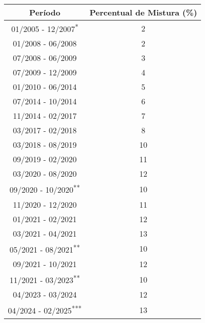 \begin{tabular}{|c|c|}
	\hline
	\textbf{Período}                       & \textbf{Percentual de Mistura (\%)} \\
	\hline
	01/2005 - 12/2007\textsuperscript{*}   & 2                                   \\
	01/2008 - 06/2008                      & 2                                   \\
	07/2008 - 06/2009                      & 3                                   \\
	07/2009 - 12/2009                      & 4                                   \\
	01/2010 - 06/2014                      & 5                                   \\
	07/2014 - 10/2014                      & 6                                   \\
	11/2014 - 02/2017                      & 7                                   \\
	03/2017 - 02/2018                      & 8                                   \\
	03/2018 - 08/2019                      & 10                                  \\
	09/2019 - 02/2020                      & 11                                  \\
	03/2020 - 08/2020                      & 12                                  \\
	09/2020 - 10/2020\textsuperscript{**}  & 10                                  \\
	11/2020 - 12/2020                      & 11                                  \\
	01/2021 - 02/2021                      & 12                                  \\
	03/2021 - 04/2021                      & 13                                  \\
	05/2021 - 08/2021\textsuperscript{**}  & 10                                  \\
	09/2021 - 10/2021                      & 12                                  \\
	11/2021 - 03/2023\textsuperscript{**}  & 10                                  \\
	04/2023 - 03/2024                      & 12                                  \\
	04/2024 - 02/2025\textsuperscript{***} & 13                                  \\

\end{tabular}
